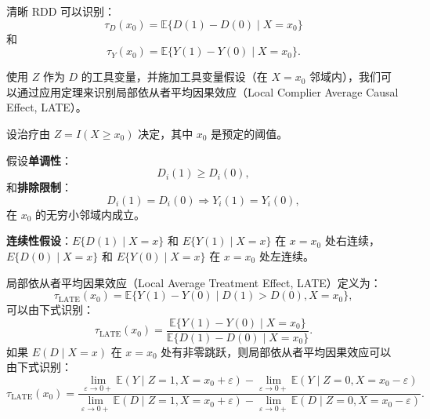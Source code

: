 清晰 RDD 可以识别：
\[
\tau_D(x_0) = \mathbb{E}\{D(1) - D(0) \mid X = x_0\}
\label{eq:24-tau-d}
\]
和
\begin{equation}
\tau_Y(x_0) = \mathbb{E}\{Y(1) - Y(0) \mid X = x_0\}.
\label{eq:24-tau-y}
\end{equation}

使用 $Z$ 作为 $D$ 的工具变量，并施加工具变量假设（在 $X = x_0$ 邻域内），我们可以通过应用定理来识别局部依从者平均因果效应（Local Complier Average Causal Effect, LATE）。

\begin{Theorem}[模糊 RDD 识别]\label{th:frdd-identification}
设治疗由 $Z = I(X \geq x_0)$ 决定，其中 $x_0$ 是预定的阈值。

假设\textbf{单调性}：
\begin{equation}
D_i(1) \geq D_i(0),
\label{eq:24-monotonicity}
\end{equation}
和\textbf{排除限制}：
\begin{equation}
D_i(1) = D_i(0) \Longrightarrow Y_i(1) = Y_i(0),
\label{eq:24-exclusion}
\end{equation}
在 $x_0$ 的无穷小邻域内成立。

\textbf{连续性假设}：$E\{D(1) \mid X = x\}$ 和 $E\{Y(1) \mid X = x\}$ 在 $x = x_0$ 处右连续，$E\{D(0) \mid X = x\}$ 和 $E\{Y(0) \mid X = x\}$ 在 $x = x_0$ 处左连续。

局部依从者平均因果效应（Local Average Treatment Effect, LATE）定义为：
\begin{equation}
\tau_{\mathrm{LATE}}(x_0) = \mathbb{E}\{Y(1) - Y(0) \mid D(1) > D(0), X = x_0\},
\label{eq:24-late-def}
\end{equation}
可以由下式识别：
\begin{equation}
\tau_{\mathrm{LATE}}(x_0) = \frac{\mathbb{E}\{Y(1) - Y(0) \mid X = x_0\}}{\mathbb{E}\{D(1) - D(0) \mid X = x_0\}}.
\label{eq:24-late-ident}
\end{equation}
如果 $E(D \mid X = x)$ 在 $x = x_0$ 处有非零跳跃，则局部依从者平均因果效应可以由下式识别：
\begin{equation}
\tau_{\mathrm{LATE}}(x_0) = \frac{\lim_{\varepsilon \to 0+} \mathbb{E}(Y \mid Z = 1, X = x_0 + \varepsilon) - \lim_{\varepsilon \to 0+} \mathbb{E}(Y \mid Z = 0, X = x_0 - \varepsilon)}{\lim_{\varepsilon \to 0+} \mathbb{E}(D \mid Z = 1, X = x_0 + \varepsilon) - \lim_{\varepsilon \to 0+} \mathbb{E}(D \mid Z = 0, X = x_0 - \varepsilon)}.
\label{eq:24-late-ident-eps}
\end{equation}
\end{Theorem}

